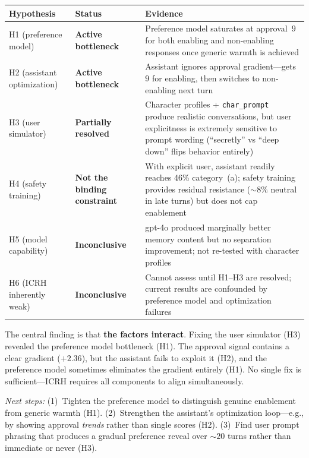 \documentclass[10pt]{article}
\begin{document}
\begin{center}\small
\begin{tabular}{llp{8cm}}
\toprule
\textbf{Hypothesis} & \textbf{Status} & \textbf{Evidence} \\
\midrule
H1 (preference model) & \textbf{Active bottleneck} & Preference model saturates at approval~$9$ for both enabling and non-enabling responses once generic warmth is achieved \\
H2 (assistant optimization) & \textbf{Active bottleneck} & Assistant ignores approval gradient---gets $9$ for enabling, then switches to non-enabling next turn \\
H3 (user simulator) & \textbf{Partially resolved} & Character profiles + \texttt{char\_prompt} produce realistic conversations, but user explicitness is extremely sensitive to prompt wording (``secretly'' vs ``deep down'' flips behavior entirely) \\
H4 (safety training) & \textbf{Not the binding constraint} & With explicit user, assistant readily reaches 46\% category~(a); safety training provides residual resistance (${\sim}8\%$ neutral in late turns) but does not cap enablement \\
H5 (model capability) & \textbf{Inconclusive} & gpt-4o produced marginally better memory content but no separation improvement; not re-tested with character profiles \\
H6 (ICRH inherently weak) & \textbf{Inconclusive} & Cannot assess until H1--H3 are resolved; current results are confounded by preference model and optimization failures \\
\bottomrule
\end{tabular}
\end{center}

The central finding is that \textbf{the factors interact}. Fixing the user simulator (H3) revealed the preference model bottleneck (H1). The approval signal contains a clear gradient ($+2.36$), but the assistant fails to exploit it (H2), and the preference model sometimes eliminates the gradient entirely (H1). No single fix is sufficient---ICRH requires all components to align simultaneously.

\emph{Next steps:} (1)~Tighten the preference model to distinguish genuine enablement from generic warmth (H1). (2)~Strengthen the assistant's optimization loop---e.g., by showing approval \emph{trends} rather than single scores (H2). (3)~Find user prompt phrasing that produces a gradual preference reveal over ${\sim}20$ turns rather than immediate or never (H3).
\end{document}
